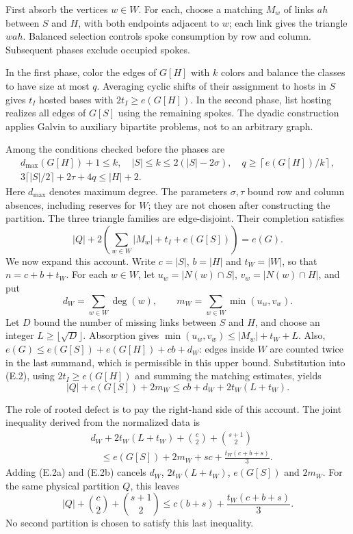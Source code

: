 \documentclass[english,11pt,a4paper]{article}
\begin{document}
First absorb the vertices \(w\in W\). For each, choose a matching \(M_w\) of links \(ah\) between \(S\) and \(H\), with both endpoints adjacent to \(w\); each link gives the triangle \(wah\). Balanced selection controls spoke consumption by row and column. Subsequent phases exclude occupied spokes.

In the first phase, color the edges of \(G[H]\) with \(k\) colors and balance the classes to have size at most \(q\). Averaging cyclic shifts of their assignment to hosts in \(S\) gives \(t_I\) hosted bases with \(2t_I\ge e(G[H])\). In the second phase, list hosting realizes all edges of \(G[S]\) using the remaining spokes. The dyadic construction applies Galvin to auxiliary bipartite problems, not to an arbitrary graph.

Among the conditions checked before the phases are \[
\begin{gathered}
d_{\max}(G[H])+1\le k,\quad |S|\le k\le2(|S|-2\sigma),\quad
q\ge\left\lceil e(G[H])/k\right\rceil,\\
3\lceil|S|/2\rceil+2\tau+4q\le |H|+2.
\end{gathered}
\tag{E.1}
\] Here \(d_{\max}\) denotes maximum degree. The parameters \(\sigma,\tau\) bound row and column absences, including reserves for \(W\); they are not chosen after constructing the partition. The three triangle families are edge-disjoint. Their completion satisfies \[
|Q|+2\left(\sum_{w\in W}|M_w|+t_I+e(G[S])\right)=e(G).
\tag{E.2}
\] We now expand this account. Write \(c=|S|\), \(b=|H|\) and \(t_W=|W|\), so that \(n=c+b+t_W\). For each \(w\in W\), let \(u_w=|N(w)\cap S|\), \(v_w=|N(w)\cap H|\), and put \[
d_W=\sum_{w\in W}\deg(w),\qquad
m_W=\sum_{w\in W}\min(u_w,v_w).
\] Let \(D\) bound the number of missing links between \(S\) and \(H\), and choose an integer \(L\ge\lfloor\sqrt D\rfloor\). Absorption gives \(\min(u_w,v_w)\le |M_w|+t_W+L\). Also, \(e(G)\le e(G[S])+e(G[H])+cb+d_W\): edges inside \(W\) are counted twice in the last summand, which is permissible in this upper bound. Substitution into (E.2), using \(2t_I\ge e(G[H])\) and summing the matching estimates, yields \[
|Q|+e(G[S])+2m_W\le cb+d_W+2t_W(L+t_W).
\tag{E.2a}
\]

The role of rooted defect is to pay the right-hand side of this account. The joint inequality derived from the normalized data is \[
\begin{split}
&d_W+2t_W(L+t_W)+\binom c2+\binom{s+1}2\\
&\hspace{1em}\le e(G[S])+2m_W+sc+\frac{t_W(c+b+s)}3.
\end{split}
\tag{E.2b}
\] Adding (E.2a) and (E.2b) cancels \(d_W\), \(2t_W(L+t_W)\), \(e(G[S])\) and \(2m_W\). For the same physical partition \(Q\), this leaves \[
|Q|+\binom c2+\binom{s+1}2
\le c(b+s)+\frac{t_W(c+b+s)}3.
\tag{E.2c}
\] No second partition is chosen to satisfy this last inequality.
\end{document}
